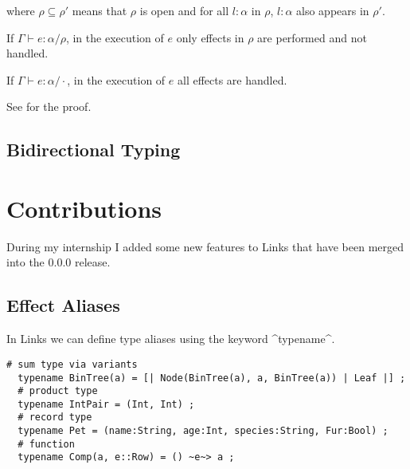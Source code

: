 \documentclass[nonacm=true, language=french, language=english]{acmart}
\begin{document}
\begin{prooftree}
\end{prooftree}

\begin{prooftree}
\end{prooftree}

where $\rho \subseteq \rho'$ means that $\rho$ is open and for all $l:\alpha$ in $\rho$, $l:\alpha$ also appears in $\rho'$.

\begin{thm}
  If $\Gamma \vdash e : \alpha / \rho$, in the execution of $e$ only effects in $\rho$ are performed and not handled.
\end{thm}
\begin{cor}
  If $\Gamma \vdash e : \alpha / \cdot$, in the execution of $e$ all effects are handled.
\end{cor}

See \cite{} for the proof.

\subsection{Bidirectional Typing}



\section{Contributions}

During my internship I added some new features to Links that have been merged into the 0.0.0 release.

\subsection{Effect Aliases}

In Links we can define type aliases using the keyword ^typename^.
\begin{lstlisting}[caption=Type alias examples]
  # sum type via variants
  typename BinTree(a) = [| Node(BinTree(a), a, BinTree(a)) | Leaf |] ;
  # product type
  typename IntPair = (Int, Int) ;
  # record type
  typename Pet = (name:String, age:Int, species:String, Fur:Bool) ;
  # function
  typename Comp(a, e::Row) = () ~e~> a ;
\end{lstlisting}
\end{document}
